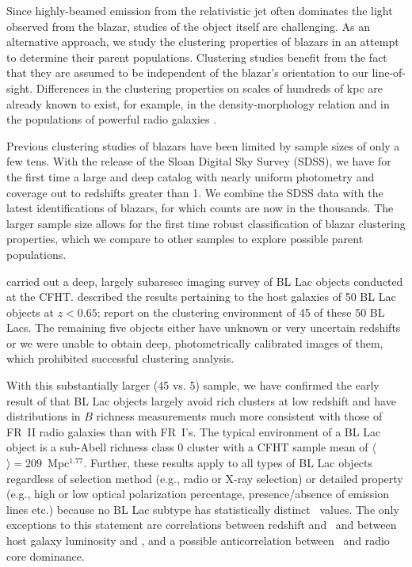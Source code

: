 \documentclass[useAMS,usenatbib]{mn2e}
\begin{document}
Since highly-beamed emission from the relativistic jet often dominates the light observed from the blazar, studies of the object itself are challenging. As an alternative approach, we study the clustering properties of blazars in an attempt to determine their parent populations. Clustering studies benefit from the fact that they are assumed to be independent of the blazar's orientation to our line-of-sight. Differences in the clustering properties on scales of hundreds of kpc are already known to exist, for example, in the density-morphology relation \citep{dre80} and in the populations of powerful radio galaxies \citep{pre88}. 

Previous clustering studies of blazars have been limited by sample sizes of only a few tens. With the release of the Sloan Digital Sky Survey (SDSS), we have for the first time a large and deep catalog with nearly uniform photometry and coverage out to redshifts greater than 1. We combine the SDSS data with the latest identifications of blazars, for which counts are now in the thousands. The larger sample size allows for the first time robust classification of blazar clustering properties, which we compare to other samples to explore possible parent populations.

\citet{wur97} carried out a deep, largely subarcsec imaging survey of BL Lac objects conducted at the CFHT. \citet{wur93} described the results pertaining to the host galaxies of 50 BL Lac objects at $z<0.65$; \citet{wur97} report on the clustering environment of 45 of these 50 BL Lacs. The remaining five objects either have unknown or very uncertain redshifts or we were unable to obtain deep, photometrically calibrated images of them, which prohibited successful clustering analysis.  

With this substantially larger (45 vs. 5) sample, we have confirmed the early result of \citet{pre88} that BL Lac objects largely avoid rich clusters at low redshift and have distributions in $B$ richness measurements much more consistent with those of FR~II radio galaxies than with FR~I's.  The typical environment of a BL Lac object is a sub-Abell richness class 0 cluster with a CFHT sample mean of $\langle$\bgb$\rangle=209$~Mpc$^{1.77}$. Further, these results apply to all types of BL Lac objects regardless of selection method (e.g., radio or X-ray selection) or detailed property (e.g., high or low optical polarization percentage, presence/absence of emission lines etc.) because no BL Lac subtype has statistically distinct \bgb~values. The only exceptions to this statement are correlations between redshift and \bgb~and between host galaxy luminosity and \bgb, and a possible anticorrelation between \bgb~and radio core dominance. 
\end{document}
